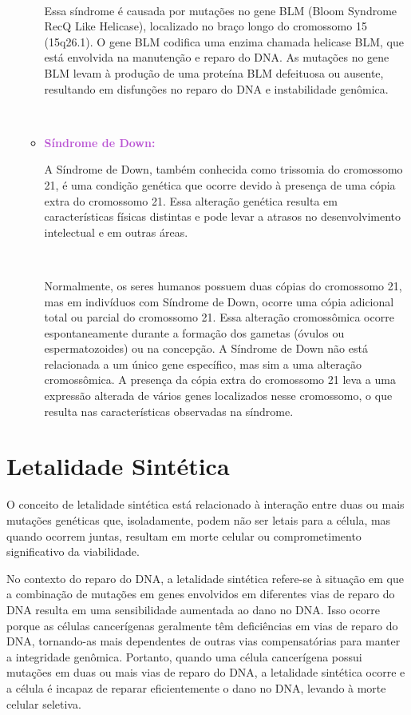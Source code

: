 \documentclass[11pt,a4paper]{article}
\begin{document}
\begin{itemize}[label=\textcolor{CarnationPink}{$\blacktriangleright$}]
\begin{itemize}[label=\textcolor{CarnationPink}{$\star$}]
			\

			Essa síndrome é causada por mutações no gene BLM (Bloom Syndrome RecQ Like Helicase), localizado no braço longo do cromossomo 15 (15q26.1). O gene BLM codifica uma enzima chamada helicase BLM, que está envolvida na manutenção e reparo do DNA. As mutações no gene BLM levam à produção de uma proteína BLM defeituosa ou ausente, resultando em disfunções no reparo do DNA e instabilidade genômica.

			\

			\item \textcolor{MediumOrchid}{\large\textbf{Síndrome de Down:}}
			
			A Síndrome de Down, também conhecida como trissomia do cromossomo 21, é uma condição genética que ocorre devido à presença de uma cópia extra do cromossomo 21. Essa alteração genética resulta em características físicas distintas e pode levar a atrasos no desenvolvimento intelectual e em outras áreas.

			\

			Normalmente, os seres humanos possuem duas cópias do cromossomo 21, mas em indivíduos com Síndrome de Down, ocorre uma cópia adicional total ou parcial do cromossomo 21. Essa alteração cromossômica ocorre espontaneamente durante a formação dos gametas (óvulos ou espermatozoides) ou na concepção. A Síndrome de Down não está relacionada a um único gene específico, mas sim a uma alteração cromossômica. A presença da cópia extra do cromossomo 21 leva a uma expressão alterada de vários genes localizados nesse cromossomo, o que resulta nas características observadas na síndrome.

		\end{itemize}
	\end{itemize}

\section{Letalidade Sintética}

	O conceito de letalidade sintética está relacionado à interação entre duas ou mais mutações genéticas que, isoladamente, podem não ser letais para a célula, mas quando ocorrem juntas, resultam em morte celular ou comprometimento significativo da viabilidade.

	No contexto do reparo do DNA, a letalidade sintética refere-se à situação em que a combinação de mutações em genes envolvidos em diferentes vias de reparo do DNA resulta em uma sensibilidade aumentada ao dano no DNA. Isso ocorre porque as células cancerígenas geralmente têm deficiências em vias de reparo do DNA, tornando-as mais dependentes de outras vias compensatórias para manter a integridade genômica. Portanto, quando uma célula cancerígena possui mutações em duas ou mais vias de reparo do DNA, a letalidade sintética ocorre e a célula é incapaz de reparar eficientemente o dano no DNA, levando à morte celular seletiva. 
\end{document}
